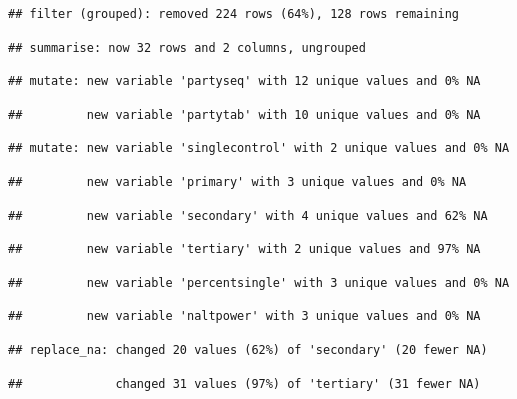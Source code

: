 \documentclass[
]{article}
\begin{document}
\begin{verbatim}
## filter (grouped): removed 224 rows (64%), 128 rows remaining
\end{verbatim}

\begin{verbatim}
## summarise: now 32 rows and 2 columns, ungrouped
\end{verbatim}

\begin{verbatim}
## mutate: new variable 'partyseq' with 12 unique values and 0% NA
\end{verbatim}

\begin{verbatim}
##         new variable 'partytab' with 10 unique values and 0% NA
\end{verbatim}

\begin{verbatim}
## mutate: new variable 'singlecontrol' with 2 unique values and 0% NA
\end{verbatim}

\begin{verbatim}
##         new variable 'primary' with 3 unique values and 0% NA
\end{verbatim}

\begin{verbatim}
##         new variable 'secondary' with 4 unique values and 62% NA
\end{verbatim}

\begin{verbatim}
##         new variable 'tertiary' with 2 unique values and 97% NA
\end{verbatim}

\begin{verbatim}
##         new variable 'percentsingle' with 3 unique values and 0% NA
\end{verbatim}

\begin{verbatim}
##         new variable 'naltpower' with 3 unique values and 0% NA
\end{verbatim}

\begin{verbatim}
## replace_na: changed 20 values (62%) of 'secondary' (20 fewer NA)
\end{verbatim}

\begin{verbatim}
##             changed 31 values (97%) of 'tertiary' (31 fewer NA)
\end{verbatim}
\end{document}
